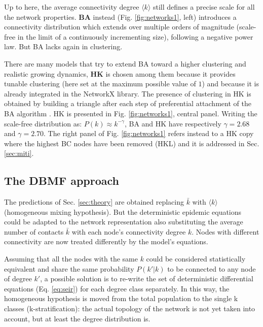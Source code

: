 \documentclass[DIV=12, BCOR=0pt]{scrartcl}  %
\begin{document}
  
  Up to here, the average connectivity degree $\langle k \rangle$ still defines a precise scale for all the network properties. \textbf{BA} instead (Fig. \ref{fig:networks1}, left) introduces a connectivity distribution which extends over multiple orders of magnitude (scale-free in the limit of a continuously incrementing size), following a negative power law. But BA lacks again in clustering. 
 
  There are many models that try to extend BA toward a higher clustering and realistic growing dynamics, \textbf{HK} is chosen among them because it provides tunable clustering (here set at the maximum possible value of $1$) and because it is already integrated in the NetworkX library. The presence of clustering in HK is obtained by building a triangle after each step of preferential attachment of the BA algorithm \citep{Holme}.
  HK is presented in Fig. \ref{fig:networks1}, central panel. Writing the scale-free distribution as: $P(k) \approx k^{- \gamma}$, BA and HK have respectively $\gamma = 2.68$ and $\gamma = 2.70$.
  The right panel of Fig. \ref{fig:networks1} refers instead to a HK copy where the highest BC nodes have been removed (HKL) and it is addressed in Sec. \ref{sec:miti}.
  
  
  \subsection{The DBMF approach} 
  The predictions of Sec. \ref{sec:theory} are obtained replacing $\bar{k}$ with $\langle k \rangle$ (homogeneous mixing hypothesis). But the deterministic epidemic equations could be adapted to the network representation also substituting the average number of contacts $\bar{k}$ with each node's connectivity degree $k$. Nodes with different connectivity are now treated differently by the model's equations.
  
  Assuming that all the nodes with the same $k$ could be considered statistically equivalent and share the same probability $P(k'|k)$ to be connected to any node of degree $k'$, a possible solution is to re-write the set of deterministic differential equations (Eq. \ref{eq:seir}) for each degree class separately.
  In this way, the homogeneous hypothesis is moved from the total population to the single k classes (k-stratification): the actual topology of the network is not yet taken into account, but at least the degree distribution is. 
  
\end{document}

